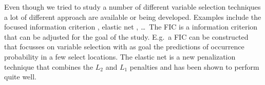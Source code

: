 Even though we tried to study a number of different variable selection techniques a lot of different approach are available or being developed. Examples include the focused information criterion \parencite[FIC, ][]{claeskens_focused_2003}, elastic net \parencite{zou_regularization_2005}, \dots\ The FIC is a information criterion that can be adjusted for the goal of the study. E.g.\ a FIC can be constructed that focusses on variable selection with as goal the predictions of occurrence probability in a few select locations. The elastic net is a new penalization technique that combines the $L_2$ and $L_1$ penalties and has been shown to perform quite well.\\


